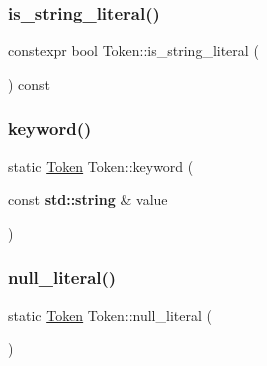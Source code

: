 \subsubsection{\texorpdfstring{is\+\_\+string\+\_\+literal()}{is\_string\_literal()}\hspace{0.1cm}{\footnotesize\ttfamily [2/2]}}
{\footnotesize\ttfamily constexpr bool Token\+::is\+\_\+string\+\_\+literal (\begin{DoxyParamCaption}{ }\end{DoxyParamCaption}) const\hspace{0.3cm}{\ttfamily [inline]}}

\mbox{\label{class_token_a379cdb72ef80cd7375fd2f31963aeafa}} 
\subsubsection{\texorpdfstring{keyword()}{keyword()}}
{\footnotesize\ttfamily static \hyperlink{class_token}{Token} Token\+::keyword (\begin{DoxyParamCaption}\item[{const \textbf{ std\+::string} \&}]{value }\end{DoxyParamCaption})\hspace{0.3cm}{\ttfamily [static]}}

\mbox{\label{class_token_a2b8cea2db3fa862b93feeebec37ec079}} 
\subsubsection{\texorpdfstring{null\+\_\+literal()}{null\_literal()}\hspace{0.1cm}{\footnotesize\ttfamily [1/2]}}
{\footnotesize\ttfamily static \hyperlink{class_token}{Token} Token\+::null\+\_\+literal (\begin{DoxyParamCaption}{ }\end{DoxyParamCaption})\hspace{0.3cm}{\ttfamily [static]}}

\mbox{\label{class_token_af892768a64f034c6d941281fd7d6b758}} 
